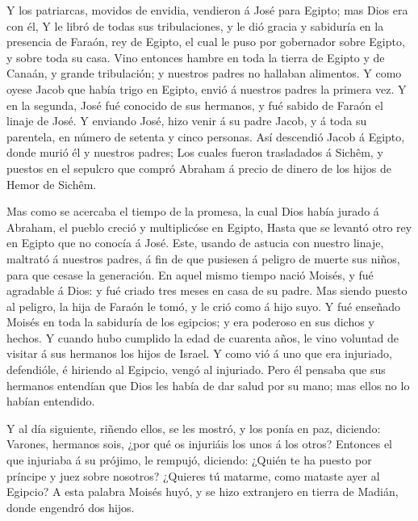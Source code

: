  Y los patriarcas, movidos de envidia, vendieron á José para
Egipto; mas Dios era con él,  Y le libró de todas sus
tribulaciones, y le dió gracia y sabiduría en la presencia de Faraón,
rey de Egipto, el cual le puso por gobernador sobre Egipto, y sobre toda
su casa.  Vino entonces hambre en toda la tierra de Egipto
y de Canaán, y grande tribulación; y nuestros padres no hallaban
alimentos.  Y como oyese Jacob que había trigo en Egipto,
envió á nuestros padres la primera vez.  Y en la segunda,
José fué conocido de sus hermanos, y fué sabido de Faraón el linaje de
José.  Y enviando José, hizo venir á su padre Jacob, y á
toda su parentela, en número de setenta y cinco personas. 
Así descendió Jacob á Egipto, donde murió él y nuestros padres;
 Los cuales fueron trasladados á Sichêm, y puestos en el
sepulcro que compró Abraham á precio de dinero de los hijos de Hemor de
Sichêm.

 Mas como se acercaba el tiempo de la promesa, la cual Dios
había jurado á Abraham, el pueblo creció y multiplicóse en Egipto,
 Hasta que se levantó otro rey en Egipto que no conocía á
José.  Este, usando de astucia con nuestro linaje, maltrató
á nuestros padres, á fin de que pusiesen á peligro de muerte sus niños,
para que cesase la generación.  En aquel mismo tiempo nació
Moisés, y fué agradable á Dios: y fué criado tres meses en casa de su
padre.  Mas siendo puesto al peligro, la hija de Faraón le
tomó, y le crió como á hijo suyo.  Y fué enseñado Moisés en
toda la sabiduría de los egipcios; y era poderoso en sus dichos y
hechos.  Y cuando hubo cumplido la edad de cuarenta años,
le vino voluntad de visitar á sus hermanos los hijos de Israel.
 Y como vió á uno que era injuriado, defendióle, é hiriendo
al Egipcio, vengó al injuriado.  Pero él pensaba que sus
hermanos entendían que Dios les había de dar salud por su mano; mas
ellos no lo habían entendido.

 Y al día siguiente, riñendo ellos, se les mostró, y los
ponía en paz, diciendo: Varones, hermanos sois, ¿por qué os injuriáis
los unos á los otros?  Entonces el que injuriaba á su
prójimo, le rempujó, diciendo: ¿Quién te ha puesto por príncipe y juez
sobre nosotros?  ¿Quieres tú matarme, como mataste ayer al
Egipcio?  A esta palabra Moisés huyó, y se hizo extranjero
en tierra de Madián, donde engendró dos hijos.

